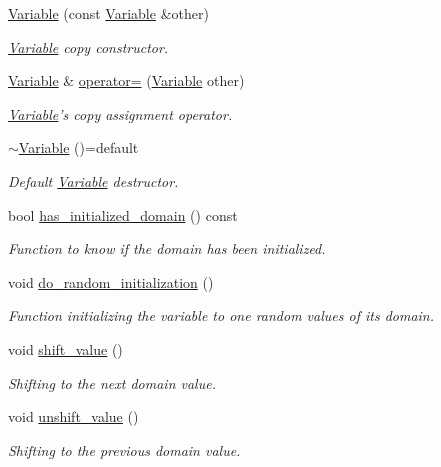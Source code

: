 \begin{DoxyCompactItemize}
\hyperlink{classghost_1_1Variable_ac9fb0513e1d15a047816821e034589ea}{Variable} (const \hyperlink{classghost_1_1Variable}{Variable} \&other)
\begin{DoxyCompactList}\small\item\em \hyperlink{classghost_1_1Variable}{Variable} copy constructor. \end{DoxyCompactList}\item 
\hyperlink{classghost_1_1Variable}{Variable} \& \hyperlink{classghost_1_1Variable_ad82b892892c3531cc3d54d6b5d048bf6}{operator=} (\hyperlink{classghost_1_1Variable}{Variable} other)
\begin{DoxyCompactList}\small\item\em \hyperlink{classghost_1_1Variable}{Variable}'s copy assignment operator. \end{DoxyCompactList}\item 
\hyperlink{classghost_1_1Variable_a06aa85e69ddf9a887dcc31c61dca70ab}{$\sim$\-Variable} ()=default
\begin{DoxyCompactList}\small\item\em Default \hyperlink{classghost_1_1Variable}{Variable} destructor. \end{DoxyCompactList}\item 
bool \hyperlink{classghost_1_1Variable_a3c858960deefe1fd3d685bf0440e50c5}{has\-\_\-initialized\-\_\-domain} () const 
\begin{DoxyCompactList}\small\item\em Function to know if the domain has been initialized. \end{DoxyCompactList}\item 
void \hyperlink{classghost_1_1Variable_a37018e24ee21e12649599409d7ac3640}{do\-\_\-random\-\_\-initialization} ()
\begin{DoxyCompactList}\small\item\em Function initializing the variable to one random values of its domain. \end{DoxyCompactList}\item 
void \hyperlink{classghost_1_1Variable_accb4028c4ea4c1108aac7900dfa223fc}{shift\-\_\-value} ()
\begin{DoxyCompactList}\small\item\em Shifting to the next domain value. \end{DoxyCompactList}\item 
void \hyperlink{classghost_1_1Variable_a7815ce9c582316082e88c2bb3137a914}{unshift\-\_\-value} ()
\begin{DoxyCompactList}\small\item\em Shifting to the previous domain value. \end{DoxyCompactList}\item 

\end{DoxyCompactItemize}
